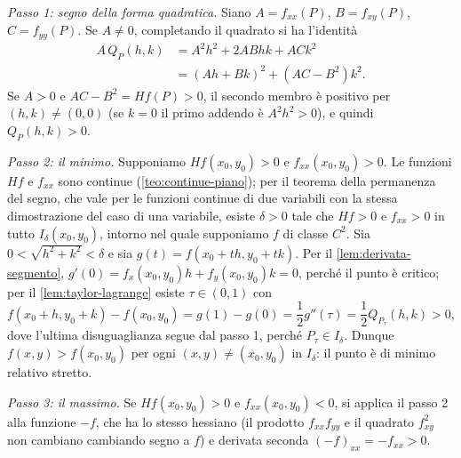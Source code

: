 \begin{dimostrazione}
\emph{Passo 1: segno della forma quadratica.} Siano $A=f_{xx}(P)$, $B=f_{xy}(P)$,
$C=f_{yy}(P)$. Se $A\neq0$, completando il quadrato si ha l'identità
\begin{equation}\label{eq:completamento-quadrato}
\begin{split}
  A\,Q_{P}(h,k)&=A^{2}h^{2}+2ABhk+ACk^{2}\\
  &=(Ah+Bk)^{2}+(AC-B^{2})k^{2} .
\end{split}
\end{equation}
Se $A>0$ e $AC-B^{2}=Hf(P)>0$, il secondo membro è positivo per $(h,k)\neq(0,0)$ (se $k=0$
il primo addendo è $A^{2}h^{2}>0$), e quindi $Q_{P}(h,k)>0$.

\emph{Passo 2: il minimo.} Supponiamo $Hf(x_{0},y_{0})>0$ e $f_{xx}(x_{0},y_{0})>0$. Le
funzioni $Hf$ e $f_{xx}$ sono continue (\cref{teo:continue-piano}); per il teorema della
permanenza del segno, che vale per le funzioni continue di due variabili con la stessa
dimostrazione del caso di una variabile, esiste $\delta>0$ tale che $Hf>0$ e $f_{xx}>0$ in
tutto $I_{\delta}(x_{0},y_{0})$, intorno nel quale supponiamo $f$ di classe $C^{2}$. Sia
$0<\sqrt{h^{2}+k^{2}}<\delta$ e sia $g(t)=f(x_{0}+th,y_{0}+tk)$. Per il
\cref{lem:derivata-segmento}, $g'(0)=f_{x}(x_{0},y_{0})h+f_{y}(x_{0},y_{0})k=0$, perché il
punto è critico; per il \cref{lem:taylor-lagrange} esiste $\tau\in(0,1)$ con
\[
  f(x_{0}+h,y_{0}+k)-f(x_{0},y_{0})=g(1)-g(0)=\frac12g''(\tau)=\frac12Q_{P_{\tau}}(h,k)>0,
\]
dove l'ultima disuguaglianza segue dal passo 1, perché $P_{\tau}\in I_{\delta}$. Dunque
$f(x,y)>f(x_{0},y_{0})$ per ogni $(x,y)\neq(x_{0},y_{0})$ in $I_{\delta}$: il punto è di minimo
relativo stretto.

\emph{Passo 3: il massimo.} Se $Hf(x_{0},y_{0})>0$ e $f_{xx}(x_{0},y_{0})<0$, si applica il
passo 2 alla funzione $-f$, che ha lo stesso hessiano (il prodotto $f_{xx}f_{yy}$ e il
quadrato $f_{xy}^{2}$ non cambiano cambiando segno a $f$) e derivata seconda
$(-f)_{xx}=-f_{xx}>0$.


\end{dimostrazione}
